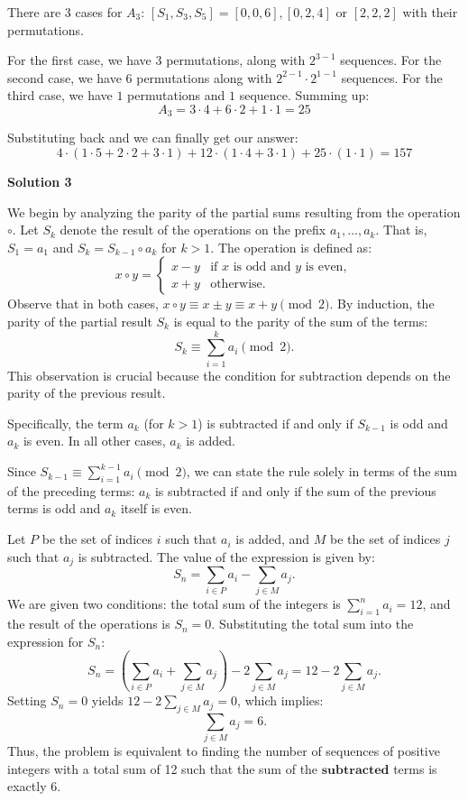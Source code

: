 \begin{enumerate}
 There are 3 cases for $A_3$: $[S_1, S_3, S_5]= [0, 0, 6], [0, 2, 4]$ or $[2, 2, 2]$ with their permutations.

 For the first case, we have $3$ permutations, along with $2^{3- 1}$ sequences. For the second case, we have $6$ permutations along with $2^{2- 1} \cdot 2^{1- 1}$ sequences. For the third case, we have $1$ permutations and $1$ sequence. Summing up:
 \[A_3= 3 \cdot 4+ 6 \cdot 2+ 1 \cdot 1= 25\]

 Substituting back and we can finally get our answer:
 \[4 \cdot (1 \cdot 5+ 2 \cdot 2+ 3 \cdot 1)+ 12 \cdot (1 \cdot 4+ 3 \cdot 1)+ 25 \cdot (1 \cdot 1)= \boxed{157}\]




\textbf{Solution 3}

We begin by analyzing the parity of the partial sums resulting from the operation $\circ$. Let $S_k$ denote the result of the operations on the prefix $a_1, \dots, a_k$. That is, $S_1 = a_1$ and $S_k = S_{k-1} \circ a_k$ for $k > 1$. The operation is defined as:
 \[x \circ y = \begin{cases} x - y & \text{if } x \text{ is odd and } y \text{ is even}, \\ x + y & \text{otherwise}. \end{cases}\]Observe that in both cases, $x \circ y \equiv x \pm y \equiv x + y \pmod 2$. By induction, the parity of the partial result $S_k$ is equal to the parity of the sum of the terms:
 \[S_k \equiv \sum_{i=1}^k a_i \pmod 2.\]This observation is crucial because the condition for subtraction depends on the parity of the previous result.

 Specifically, the term $a_k$ (for $k > 1$) is subtracted if and only if $S_{k-1}$ is odd and $a_k$ is even. In all other cases, $a_k$ is added. 

 Since $S_{k-1} \equiv\sum_{i=1}^{k-1} a_i \pmod 2$, we can state the rule solely in terms of the sum of the preceding terms: $a_k$ is subtracted if and only if the sum of the previous terms is odd and $a_k$ itself is even.

 Let $P$ be the set of indices $i$ such that $a_i$ is added, and $M$ be the set of indices $j$ such that $a_j$ is subtracted. The value of the expression is given by:
 \[S_n = \sum_{i \in P} a_i - \sum_{j \in M} a_j.\]We are given two conditions: the total sum of the integers is $\sum_{i=1}^n a_i = 12$, and the result of the operations is $S_n = 0$. Substituting the total sum into the expression for $S_n$:
 \[S_n = \left(\sum_{i \in P} a_i + \sum_{j \in M} a_j\right) - 2\sum_{j \in M} a_j = 12 - 2\sum_{j \in M} a_j.\]Setting $S_n = 0$ yields $12 - 2\sum_{j \in M} a_j = 0$, which implies:
 \[\sum_{j \in M} a_j = 6.\]Thus, the problem is equivalent to finding the number of sequences of positive integers with a total sum of 12 such that the sum of the  $\textbf{subtracted}$  terms is exactly 6.


\end{enumerate}
